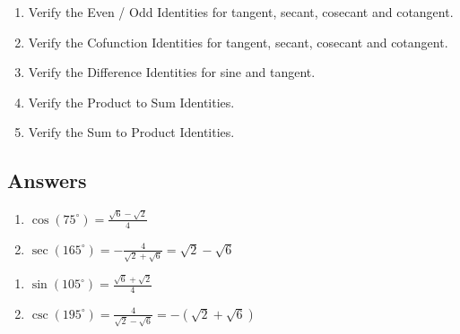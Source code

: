 \begin{enumerate}

\setcounter{enumi}{\value{HW}}

\item Verify the Even / Odd Identities for tangent, secant, cosecant and cotangent.

\item Verify the Cofunction Identities for tangent, secant, cosecant and cotangent.

\item Verify the Difference Identities for sine and tangent.

\item Verify the Product to Sum Identities.

\item Verify the Sum to Product Identities.

\end{enumerate}

\newpage

\subsection{Answers}

\begin{multicols}{2}

\begin{enumerate}

\addtocounter{enumi}{6}

\item  $\cos(75^{\circ}) = \frac{\sqrt{6} - \sqrt{2}}{4} $
\item  $\sec(165^{\circ}) = -\frac{4}{\sqrt{2}+\sqrt{6}} = \sqrt{2} - \sqrt{6}$

\setcounter{HW}{\value{enumi}}

\end{enumerate}

\end{multicols}

\begin{multicols}{2}

\begin{enumerate}

\setcounter{enumi}{\value{HW}}

\item  $\sin(105^{\circ}) = \frac{\sqrt{6}+\sqrt{2}}{4}$
\item  $\csc(195^{\circ}) = \frac{4}{\sqrt{2}-\sqrt{6}} = -(\sqrt{2}+\sqrt{6})$

\setcounter{HW}{\value{enumi}}

\end{enumerate}

\end{multicols}


